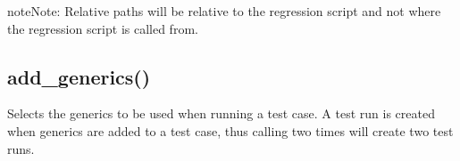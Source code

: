 \documentclass[letterpaper,10pt,english]{sphinxmanual}
\begin{document}
\sphinxAtStartPar
{}

\begin{sphinxVerbatim}[commandchars=\\\{\}]
  

  
\end{sphinxVerbatim}

\begin{sphinxadmonition}{note}{Note:}
\sphinxAtStartPar
Relative paths will be relative to the regression script
and not where the regression script is called from.
\end{sphinxadmonition}


\subsection{add\_generics()}
\label{\detokenize{api:add-generics}}
\sphinxAtStartPar
Selects the generics to be used when running a test case.
A test run is created when generics are added to a test case, thus calling {\hyperref[\detokenize{api:add-generics}]{}} two times will create
two test runs.

\begin{sphinxVerbatim}[commandchars=\\\{\}]
  
\end{sphinxVerbatim}
\end{document}
